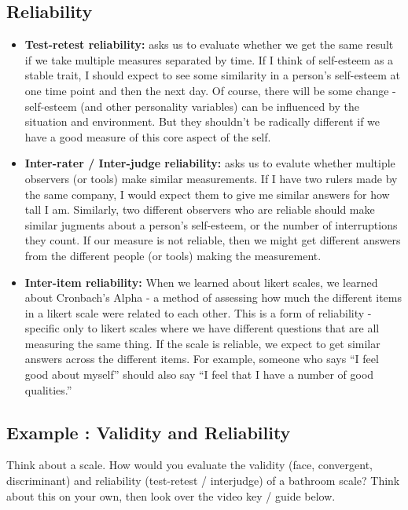 \documentclass[
  letterpaper,
  DIV=11,
  numbers=noendperiod,
  oneside]{scrreprt}
\begin{document}
\subsection{Reliability}\label{reliability}

\begin{itemize}
\item
  \textbf{Test-retest reliability:} asks us to evaluate whether we get
  the same result if we take multiple measures separated by time. If I
  think of self-esteem as a stable trait, I should expect to see some
  similarity in a person's self-esteem at one time point and then the
  next day. Of course, there will be some change - self-esteem (and
  other personality variables) can be influenced by the situation and
  environment. But they shouldn't be radically different if we have a
  good measure of this core aspect of the self.
\item
  \textbf{Inter-rater / Inter-judge reliability:} asks us to evalute
  whether multiple observers (or tools) make similar measurements. If I
  have two rulers made by the same company, I would expect them to give
  me similar answers for how tall I am. Similarly, two different
  observers who are reliable should make similar jugments about a
  person's self-esteem, or the number of interruptions they count. If
  our measure is not reliable, then we might get different answers from
  the different people (or tools) making the measurement.
\item
  \textbf{Inter-item reliability:} When we learned about likert scales,
  we learned about Cronbach's Alpha - a method of assessing how much the
  different items in a likert scale were related to each other. This is
  a form of reliability - specific only to likert scales where we have
  different questions that are all measuring the same thing. If the
  scale is reliable, we expect to get similar answers across the
  different items. For example, someone who says ``I feel good about
  myself'' should also say ``I feel that I have a number of good
  qualities.''
\end{itemize}

\subsection{Example : Validity and
Reliability}\label{example-validity-and-reliability}

Think about a scale. How would you evaluate the validity (face,
convergent, discriminant) and reliability (test-retest / interjudge) of
a bathroom scale? Think about this on your own, then look over the video
key / guide below.
\end{document}
